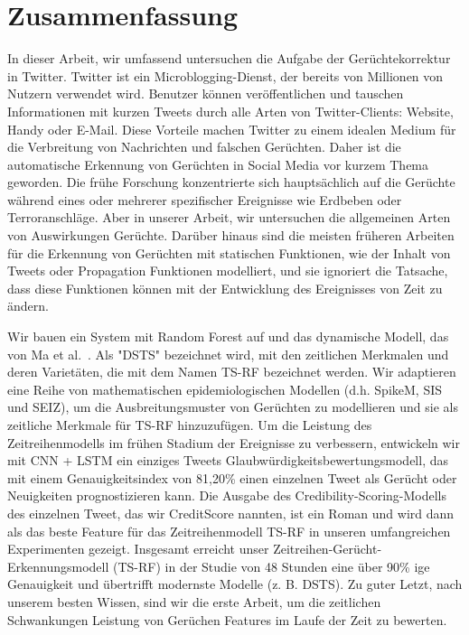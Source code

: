 \chapter*{Zusammenfassung}
In dieser Arbeit, wir umfassend untersuchen die Aufgabe der Ger\"uchtekorrektur in Twitter. Twitter ist ein Microblogging-Dienst, der bereits von Millionen von Nutzern verwendet wird. Benutzer k\"onnen ver\"offentlichen und tauschen Informationen mit kurzen Tweets durch alle Arten von Twitter-Clients: Website, Handy oder E-Mail. Diese Vorteile machen Twitter zu einem idealen Medium f\"ur die Verbreitung von Nachrichten und falschen Ger\"uchten. Daher ist die automatische Erkennung von Ger\"uchten in Social Media vor kurzem Thema geworden. Die fr\"uhe Forschung konzentrierte sich haupts\"achlich auf die Ger\"uchte w\"ahrend eines oder mehrerer spezifischer Ereignisse wie Erdbeben oder Terroranschl\"age. Aber in unserer Arbeit, wir untersuchen die allgemeinen Arten von Auswirkungen Ger\"uchte. Dar\"uber hinaus sind die meisten fr\"uheren Arbeiten f\"ur die Erkennung von Ger\"uchten mit statischen Funktionen, wie der Inhalt von Tweets oder Propagation Funktionen modelliert, und sie ignoriert die Tatsache, dass diese Funktionen k\"onnen mit der Entwicklung des Ereignisses von Zeit zu \"andern.

Wir bauen ein System mit Random Forest auf und das dynamische Modell, das von Ma et al.~\cite{ma2015detect}. Als "DSTS" bezeichnet wird, mit den zeitlichen Merkmalen und deren Variet\"aten, die mit dem Namen TS-RF bezeichnet werden. Wir adaptieren eine Reihe von mathematischen epidemiologischen Modellen (d.h. SpikeM, SIS und SEIZ), um die Ausbreitungsmuster von Ger\"uchten zu modellieren und sie als zeitliche Merkmale f\"ur TS-RF hinzuzuf\"ugen. Um die Leistung des Zeitreihenmodells im fr\"uhen Stadium der Ereignisse zu verbessern, entwickeln wir mit CNN + LSTM ein einziges Tweets Glaubw\"urdigkeitsbewertungsmodell, das mit einem Genauigkeitsindex von 81,20\% einen einzelnen Tweet als Ger\"ucht oder Neuigkeiten prognostizieren kann. Die Ausgabe des Credibility-Scoring-Modells des einzelnen Tweet, das wir CreditScore nannten, ist ein Roman und wird dann als das beste Feature f\"ur das Zeitreihenmodell TS-RF in unseren umfangreichen Experimenten gezeigt. Insgesamt erreicht unser Zeitreihen-Ger\"ucht-Erkennungsmodell (TS-RF) in der Studie von 48 Stunden eine \"uber 90\% ige Genauigkeit und \"ubertrifft modernste Modelle (z. B. DSTS). Zu guter Letzt, nach unserem besten Wissen, sind wir die erste Arbeit, um die zeitlichen Schwankungen Leistung von Ger\"uchen Features im Laufe der Zeit zu bewerten.
